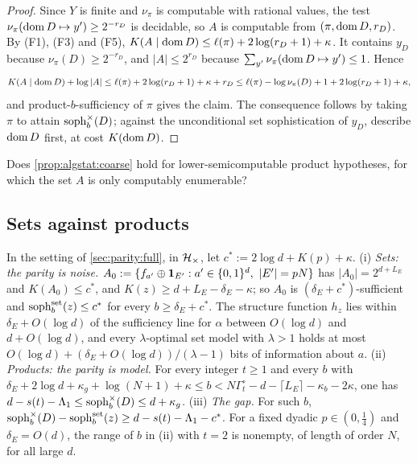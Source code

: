 \begin{proof}
Since $Y$ is finite and $\nu_\pi$ is computable with rational values, the test $\nu_\pi(\operatorname{dom} D\mapsto y')\ge2^{-r_D}$ is decidable, so $A$ is computable from $(\pi,\operatorname{dom} D,r_D)$. By (F1), (F3) and (F5), $K(A\mid\operatorname{dom} D)\le\ell(\pi)+2\log(r_D+1)+\kappa$. It contains $y_D$ because $\nu_\pi(D)\ge2^{-r_D}$, and $|A|\le2^{r_D}$ because $\sum_{y'}\nu_\pi(\operatorname{dom} D\mapsto y')\le1$. Hence
\[
K(A\mid\operatorname{dom} D)+\log|A|\le\ell(\pi)+2\log(r_D+1)+\kappa+r_D\le\ell(\pi)-\log\nu_\pi(D)+1+2\log(r_D+1)+\kappa,
\]
and product-$b$-sufficiency of $\pi$ gives the claim. The consequence follows by taking $\pi$ to attain $\operatorname{soph}^{\times}_b(D)$; against the unconditional set sophistication of $y_D$, describe $\operatorname{dom} D$ first, at cost $K(\operatorname{dom} D)$.
\end{proof}

\begin{question}\label{q:algstat:lsc}
Does \cref{prop:algstat:coarse} hold for lower-semicomputable product hypotheses, for which the set $A$ is only computably enumerable?
\end{question}

\subsection{Sets against products}\label{app:algstat:parity}

\begin{proposition}\label{prop:algstat:parity}
In the setting of \cref{sec:parity:full}, in $\mathcal{H}_{\times}$, let $c^*:=2\log d+K(p)+\kappa$.
(i) \emph{Sets: the parity is noise.} $A_0:=\{f_{a'}\oplus\ind_{E'}:a'\in\{0,1\}^d,\ |E'|=pN\}$ has $|A_0|=2^{d+L_E}$ and $K(A_0)\le c^*$, and $K(z)\ge d+L_E-\delta_E-\kappa$; so $A_0$ is $(\delta_E+c^*)$-sufficient and $\operatorname{soph}^{\mathrm{set}}_b(z)\le c^*$ for every $b\ge\delta_E+c^*$. The structure function $h_z$ lies within $\delta_E+O(\log d)$ of the sufficiency line for $\alpha$ between $O(\log d)$ and $d+O(\log d)$, and every $\lambda$-optimal set model with $\lambda>1$ holds at most $O(\log d)+(\delta_E+O(\log d))/(\lambda-1)$ bits of information about $a$.
(ii) \emph{Products: the parity is model.} For every integer $t\ge1$ and every $b$ with $\delta_E+2\log d+\kappa_g+\log(N+1)+\kappa\le b<N\Gamma^\circ_t-d-\lceil L_E\rceil-\kappa_b-2\kappa$, one has $d-s(t)-\Lambda_1\le\operatorname{soph}^{\times}_b(D)\le d+\kappa_g$.
(iii) \emph{The gap.} For such $b$, $\operatorname{soph}^{\times}_b(D)-\operatorname{soph}^{\mathrm{set}}_b(z)\ge d-s(t)-\Lambda_1-c^*$. For a fixed dyadic $p\in(0,\frac14)$ and $\delta_E=O(d)$, the range of $b$ in (ii) with $t=2$ is nonempty, of length of order $N$, for all large $d$.
\end{proposition}

